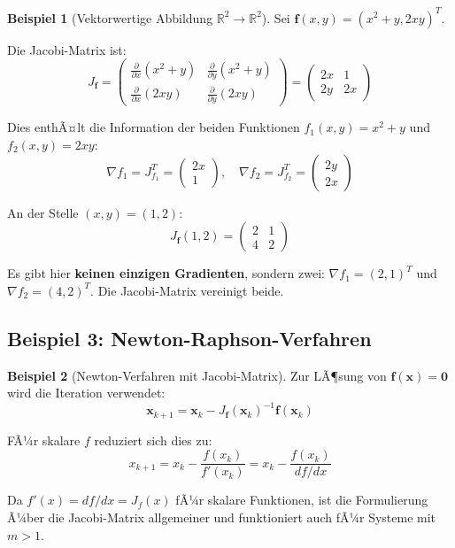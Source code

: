 ﻿\documentclass[a4paper,12pt]{article}
\theoremstyle{definition}
\newtheorem{beispiel}{Beispiel}
\begin{document}
\begin{beispiel}[Vektorwertige Abbildung $\mathbb{R}^2 \to \mathbb{R}^2$]
	Sei $\boldsymbol{f}(x, y) = (x^2 + y, 2xy)^T$.
	
	Die Jacobi-Matrix ist:
	\[
	J_{\boldsymbol{f}} = \begin{pmatrix}
		\frac{\partial}{\partial x}(x^2 + y) & \frac{\partial}{\partial y}(x^2 + y) \\
		\frac{\partial}{\partial x}(2xy) & \frac{\partial}{\partial y}(2xy)
	\end{pmatrix} = \begin{pmatrix}
		2x & 1 \\
		2y & 2x
	\end{pmatrix}
	\]
	
	Dies enthÃ¤lt die Information der beiden Funktionen $f_1(x,y) = x^2 + y$ und $f_2(x,y) = 2xy$:
	\[
	\nabla f_1 = J_{f_1}^T = \begin{pmatrix} 2x \\ 1 \end{pmatrix}, \quad
	\nabla f_2 = J_{f_2}^T = \begin{pmatrix} 2y \\ 2x \end{pmatrix}
	\]
	
	An der Stelle $(x, y) = (1, 2)$:
	\[
	J_{\boldsymbol{f}}(1, 2) = \begin{pmatrix} 2 & 1 \\ 4 & 2 \end{pmatrix}
	\]
	
	Es gibt hier \textbf{keinen einzigen Gradienten}, sondern zwei: $\nabla f_1 = (2, 1)^T$ und $\nabla f_2 = (4, 2)^T$. Die Jacobi-Matrix vereinigt beide.
\end{beispiel}

\subsection{Beispiel 3: Newton-Raphson-Verfahren}

\begin{beispiel}[Newton-Verfahren mit Jacobi-Matrix]
	Zur LÃ¶sung von $\boldsymbol{f}(\boldsymbol{x}) = \boldsymbol{0}$ wird die Iteration verwendet:
	\[
	\boldsymbol{x}_{k+1} = \boldsymbol{x}_k - J_{\boldsymbol{f}}(\boldsymbol{x}_k)^{-1} \boldsymbol{f}(\boldsymbol{x}_k)
	\]
	
	FÃ¼r skalare $f$ reduziert sich dies zu:
	\[
	x_{k+1} = x_k - \frac{f(x_k)}{f'(x_k)} = x_k - \frac{f(x_k)}{df/dx}
	\]
	
	Da $f'(x) = df/dx = J_f(x)$ fÃ¼r skalare Funktionen, ist die Formulierung Ã¼ber die Jacobi-Matrix allgemeiner und funktioniert auch fÃ¼r Systeme mit $m > 1$.
\end{beispiel}
\end{document}
